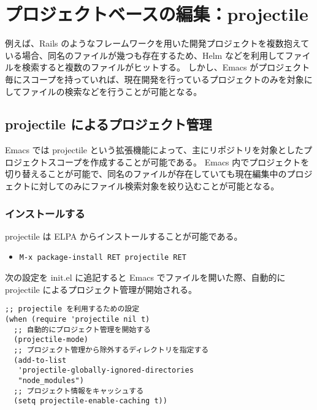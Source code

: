 \section{プロジェクトベースの編集：projectile}
例えば、Rails のようなフレームワークを用いた開発プロジェクトを複数抱えている場合、同名のファイルが幾つも存在するため、Helm などを利用してファイルを検索すると複数のファイルがヒットする。
しかし、Emacs がプロジェクト毎にスコープを持っていれば、現在開発を行っているプロジェクトのみを対象にしてファイルの検索などを行うことが可能となる。
\subsection{projectile によるプロジェクト管理}
Emacs では projectile という拡張機能によって、主にリポジトリを対象としたプロジェクトスコープを作成することが可能である。
Emacs 内でプロジェクトを切り替えることが可能で、同名のファイルが存在していても現在編集中のプロジェクトに対してのみにファイル検索対象を絞り込むことが可能となる。
\subsubsection{インストールする}
projectile は ELPA からインストールすることが可能である。
\begin{itemize}\setlength{\leftskip}{-1.00zw}%
\item[] \texttt{M-x package-install RET projectile RET}
\end{itemize}
次の設定を init.el に追記すると Emacs でファイルを開いた際、自動的に projectile によるプロジェクト管理が開始される。
\begin{mdframed}[roundcorner=0.50zw,leftmargin=3.00zw,rightmargin=3.00zw,skipabove=0.40zw,skipbelow=0.40zw,innertopmargin=4.00pt,innerbottommargin=4.00pt,innerleftmargin=5.00pt,innerrightmargin=5.00pt,linecolor=gray!020,linewidth=0.50pt,backgroundcolor=gray!20]
\begin{verbatim}
;; projectile を利用するための設定
(when (require 'projectile nil t)
  ;; 自動的にプロジェクト管理を開始する
  (projectile-mode)
  ;; プロジェクト管理から除外するディレクトリを指定する
  (add-to-list
   'projectile-globally-ignored-directories
   "node_modules")
  ;; プロジェクト情報をキャッシュする
  (setq projectile-enable-caching t))
\end{verbatim}
\end{mdframed}
